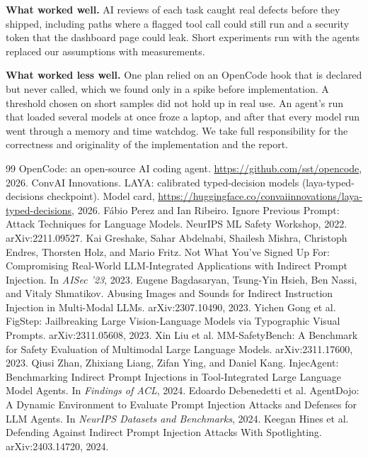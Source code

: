 \documentclass[sigconf,nonacm]{acmart}
\begin{document}
\textbf{What worked well.} AI reviews of each task caught real defects before they shipped, including paths where a flagged tool call could still run and a security token that the dashboard page could leak. Short experiments run with the agents replaced our assumptions with measurements.

\textbf{What worked less well.} One plan relied on an OpenCode hook that is declared but never called, which we found only in a spike before implementation. A threshold chosen on short samples did not hold up in real use. An agent's run that loaded several models at once froze a laptop, and after that every model run went through a memory and time watchdog. We take full responsibility for the correctness and originality of the implementation and the report.

\begin{thebibliography}{99}
 OpenCode: an open-source AI coding agent. \url{https://github.com/sst/opencode}, 2026.
 ConvAI Innovations. LAYA: calibrated typed-decision models (laya-typed-decisions checkpoint). Model card, \url{https://huggingface.co/convaiinnovations/laya-typed-decisions}, 2026.
 F\'abio Perez and Ian Ribeiro. Ignore Previous Prompt: Attack Techniques for Language Models. NeurIPS ML Safety Workshop, 2022. arXiv:2211.09527.
 Kai Greshake, Sahar Abdelnabi, Shailesh Mishra, Christoph Endres, Thorsten Holz, and Mario Fritz. Not What You've Signed Up For: Compromising Real-World LLM-Integrated Applications with Indirect Prompt Injection. In \emph{AISec '23}, 2023.
 Eugene Bagdasaryan, Tsung-Yin Hsieh, Ben Nassi, and Vitaly Shmatikov. Abusing Images and Sounds for Indirect Instruction Injection in Multi-Modal LLMs. arXiv:2307.10490, 2023.
 Yichen Gong et al. FigStep: Jailbreaking Large Vision-Language Models via Typographic Visual Prompts. arXiv:2311.05608, 2023.
 Xin Liu et al. MM-SafetyBench: A Benchmark for Safety Evaluation of Multimodal Large Language Models. arXiv:2311.17600, 2023.
 Qiusi Zhan, Zhixiang Liang, Zifan Ying, and Daniel Kang. InjecAgent: Benchmarking Indirect Prompt Injections in Tool-Integrated Large Language Model Agents. In \emph{Findings of ACL}, 2024.
 Edoardo Debenedetti et al. AgentDojo: A Dynamic Environment to Evaluate Prompt Injection Attacks and Defenses for LLM Agents. In \emph{NeurIPS Datasets and Benchmarks}, 2024.
 Keegan Hines et al. Defending Against Indirect Prompt Injection Attacks With Spotlighting. arXiv:2403.14720, 2024.

\end{thebibliography}
\end{document}
